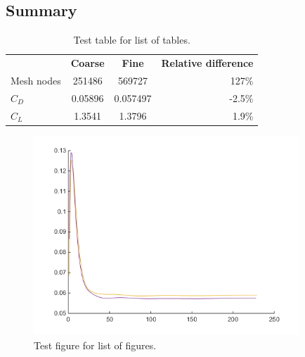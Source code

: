 \subsection{Summary}


\begin{table}[H]
\caption{Test table for list of tables.}
\centering
\begin{tabular}{lccr}
 & \textbf{Coarse}& \textbf{Fine} & \textbf{Relative difference} \\
Mesh nodes & 251486 & 569727 & 127\% \\
$C_D$ & 0.05896 & 0.057497 & -2.5\% \\
$C_L$ & 1.3541 & 1.3796 & 1.9\% \\
\end{tabular}
\label{meshilainen3dII}
\end{table}

\begin{figure}[H]
 \centering
 \includegraphics[width=10cm]{TESTimg.png}
 \caption{Test figure for list of figures.}
\label{Cd_mesh_ind}
\end{figure}
